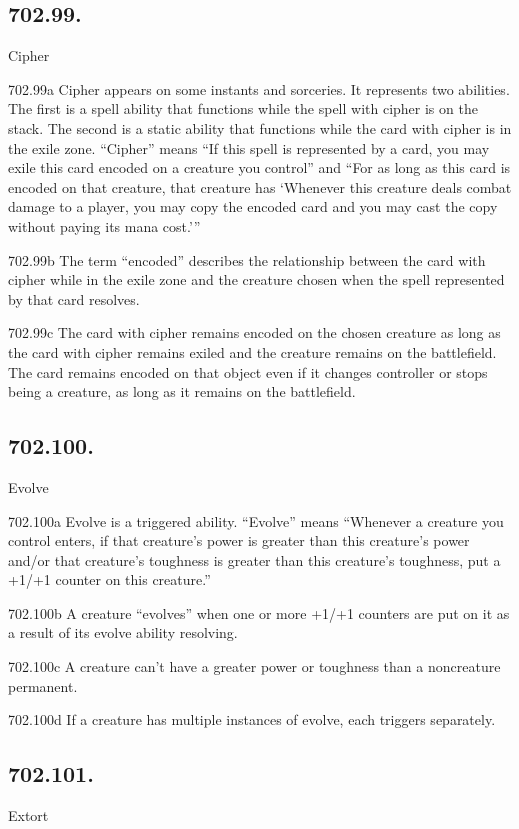\subsection*{702.99.}
Cipher

702.99a Cipher appears on some instants and sorceries. It represents two abilities. The first is a spell ability that functions while the spell with cipher is on the stack. The second is a static ability that functions while the card with cipher is in the exile zone. “Cipher” means “If this spell is represented by a card, you may exile this card encoded on a creature you control” and “For as long as this card is encoded on that creature, that creature has ‘Whenever this creature deals combat damage to a player, you may copy the encoded card and you may cast the copy without paying its mana cost.’”

702.99b The term “encoded” describes the relationship between the card with cipher while in the exile zone and the creature chosen when the spell represented by that card resolves.

702.99c The card with cipher remains encoded on the chosen creature as long as the card with cipher remains exiled and the creature remains on the battlefield. The card remains encoded on that object even if it changes controller or stops being a creature, as long as it remains on the battlefield.

\subsection*{702.100.}
Evolve

702.100a Evolve is a triggered ability. “Evolve” means “Whenever a creature you control enters, if that creature’s power is greater than this creature’s power and/or that creature’s toughness is greater than this creature’s toughness, put a +1/+1 counter on this creature.”

702.100b A creature “evolves” when one or more +1/+1 counters are put on it as a result of its evolve ability resolving.

702.100c A creature can’t have a greater power or toughness than a noncreature permanent.

702.100d If a creature has multiple instances of evolve, each triggers separately.

\subsection*{702.101.}
Extort

